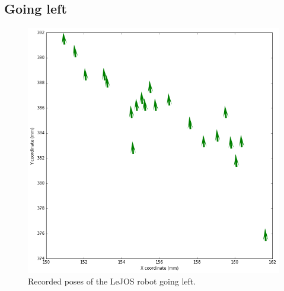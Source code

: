 \documentclass[paper=a4, fontsize=11pt]{scrartcl} %
\begin{document}
\subsection{Going left}
\begin{figure}[h!]
    \begin{center}
        \setlength{\fboxsep}{0.5pt} %
        \setlength{\fboxrule}{0.5pt}
        \includegraphics[width=12cm,fbox]{images/poses_plot_4_left.png}
        \caption{Recorded poses of the LeJOS robot going left.}
    \end{center}
\end{figure}
\end{document}

